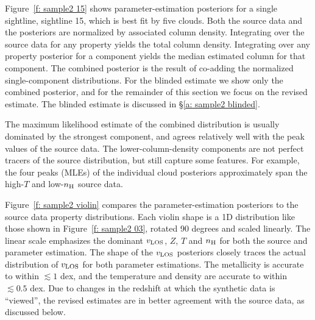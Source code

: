 \documentclass[fleqn,usenatbib]{mnras}
\begin{document}
Figure~\ref{f: sample2 15} shows parameter-estimation posteriors for a single sightline, sightline 15, which is best fit by five clouds.
Both the source data and the posteriors are normalized by associated  column density.
Integrating over the source data for any property yields the total  column density.
Integrating over any property posterior for a component yields the median estimated  column for that component.
The combined posterior is the result of co-adding the normalized single-component distributions.
For the blinded estimate we show only the combined posterior, and for the remainder of this section we focus on the revised estimate.
The blinded estimate is discussed in \S\ref{a: sample2 blinded}.

The maximum likelihood estimate of the combined distribution is usually dominated by the strongest component,
and agrees relatively well with the peak values of the source data.
The lower-column-density components are not perfect tracers of the source distribution, but still capture some features.
For example, the four peaks (MLEs) of the individual cloud posteriors approximately span the high-$T$ and low-$n_{\rm H}$ source data.

Figure~\ref{f: sample2 violin} compares the parameter-estimation posteriors to the source data property distributions.
Each violin shape is a 1D distribution like those shown in Figure~\ref{f: sample2 03}, rotated 90 degrees and scaled linearly.
The linear scale emphasizes the dominant $v_{\rm LOS}$, $Z$, $T$ and $n_{\rm H}$ for both the source and parameter estimation.
The shape of the $v_{\rm LOS}$ posteriors closely traces the actual distribution of $v_{\rm LOS}$ for both parameter estimations.
The metallicity is accurate to within $\lesssim 1$ dex,
and the temperature and density are accurate to within $\lesssim 0.5$ dex.
Due to changes in the redshift at which the synthetic data is ``viewed'', the revised estimates are in better agreement with the source data,
as discussed below.
\end{document}
